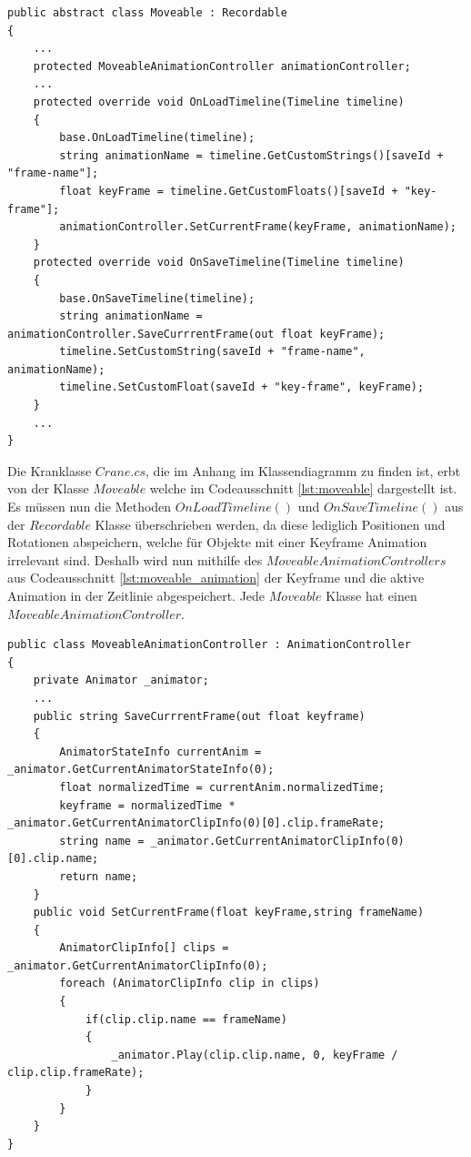 \begin{lstlisting}[caption={Ausschnitt aus Moveable.cs}, label={lst:moveable}]
public abstract class Moveable : Recordable
{
    ...
    protected MoveableAnimationController animationController;
    ...
    protected override void OnLoadTimeline(Timeline timeline)
    {
        base.OnLoadTimeline(timeline);
        string animationName = timeline.GetCustomStrings()[saveId + "frame-name"];
        float keyFrame = timeline.GetCustomFloats()[saveId + "key-frame"];
        animationController.SetCurrentFrame(keyFrame, animationName);
    }
    protected override void OnSaveTimeline(Timeline timeline)
    {
        base.OnSaveTimeline(timeline);
        string animationName = animationController.SaveCurrrentFrame(out float keyFrame);
        timeline.SetCustomString(saveId + "frame-name", animationName);
        timeline.SetCustomFloat(saveId + "key-frame", keyFrame);
    }
    ...
}
\end{lstlisting}

Die Kranklasse $Crane.cs$, die im Anhang im Klassendiagramm zu finden ist, erbt von der Klasse $Moveable$ welche im Codeausschnitt \ref{lst:moveable} dargestellt ist. Es müssen nun die Methoden $OnLoadTimeline()$ und $OnSaveTimeline()$ aus der $Recordable$ Klasse überschrieben werden, da diese lediglich Positionen und Rotationen abspeichern, welche für Objekte mit einer Keyframe Animation irrelevant sind. Deshalb wird nun mithilfe des $MoveableAnimationControllers$ aus Codeausschnitt \ref{lst:moveable_animation} der Keyframe und die aktive Animation in der Zeitlinie abgespeichert. Jede $Moveable$ Klasse hat einen $MoveableAnimationController$.

\begin{lstlisting}[caption={Ausschnitt aus MoveableAnimationController.cs}, label={lst:moveable_animation}]
public class MoveableAnimationController : AnimationController
{
    private Animator _animator;
    ...
    public string SaveCurrrentFrame(out float keyframe)
    {
        AnimatorStateInfo currentAnim = _animator.GetCurrentAnimatorStateInfo(0);
        float normalizedTime = currentAnim.normalizedTime;
        keyframe = normalizedTime * _animator.GetCurrentAnimatorClipInfo(0)[0].clip.frameRate;
        string name = _animator.GetCurrentAnimatorClipInfo(0)[0].clip.name;
        return name;
    }
    public void SetCurrentFrame(float keyFrame,string frameName)
    {
        AnimatorClipInfo[] clips = _animator.GetCurrentAnimatorClipInfo(0);
        foreach (AnimatorClipInfo clip in clips)
        {
            if(clip.clip.name == frameName)
            {
                _animator.Play(clip.clip.name, 0, keyFrame / clip.clip.frameRate);
            }
        }
    }
}
\end{lstlisting}

